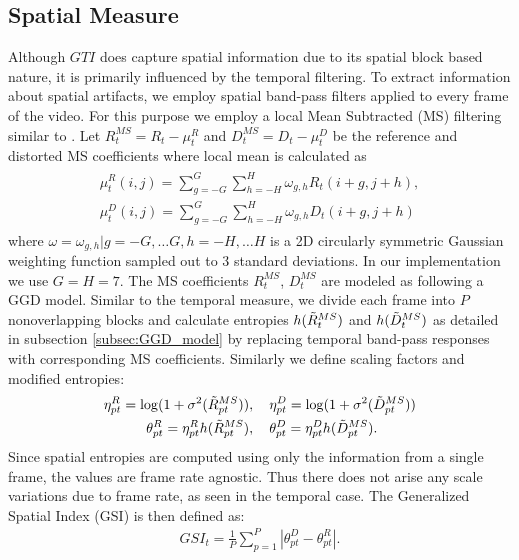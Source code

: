 \documentclass[journal]{IEEEtran}
\begin{document}
\subsection{Spatial Measure}
Although $GTI$ does capture spatial information due to its spatial block based nature, it is primarily influenced by the temporal filtering. To extract information about spatial artifacts, we employ spatial band-pass filters applied to every frame of the video. For this purpose we employ a local Mean Subtracted (MS) filtering similar to \cite{bampis2017speed}. Let $R_t ^{MS} = R_t - \mu_t ^R$ and $D_t ^{MS} = D_t - \mu_t ^D$ be the reference and distorted MS coefficients where local mean is calculated as
\begin{align*}
\begin{aligned}
    \mu_t ^R(i,j) = \sum_{g=-G} ^G \sum_{h=-H} ^H \omega_{g,h} R_t(i+g,j+h), \\ \mu_t ^D(i,j) = \sum_{g=-G} ^G \sum_{h=-H} ^H \omega_{g,h} D_t(i+g,j+h)
\end{aligned}
\end{align*}
where $\omega = {\omega_{g,h}|g = -G,\ldots G, h = -H,\ldots H}$ is a 2D
circularly symmetric Gaussian weighting function sampled out to 3 standard deviations. In our implementation we use $G = H = 7$. The MS coefficients $R_t ^{MS}$, $D_t ^{MS}$ are modeled as following a GGD model. Similar to the temporal measure, we divide each frame into $P$ nonoverlapping blocks and calculate entropies $h(\Tilde{R}_t ^{MS})$ and $h(\Tilde{D}_t ^{MS})$ as detailed in subsection \ref{subsec:GGD_model} by replacing temporal band-pass responses with corresponding MS coefficients. Similarly we define scaling factors and modified entropies:
\begin{align*}
\begin{aligned}
    \eta_{pt} ^R = \log(1+\sigma^2(\Tilde{R}_{pt}^{MS}))&, \quad \eta_{pt}^D = \log(1+\sigma^2(\Tilde{D}_{pt}^{MS})) \\
\theta_{pt} ^R = \eta_{pt} ^R h(\Tilde{R}_{pt}^{MS})&, \quad \theta_{pt} ^D = \eta_{pt} ^D h(\Tilde{D}_{pt}^{MS}).
    \end{aligned}
\end{align*}
Since spatial entropies are computed using only the information from a single frame, the values are frame rate agnostic. Thus there does not arise any scale variations due to frame rate, as seen in the temporal case. The Generalized Spatial Index (GSI) is then defined as:
\begin{align}
    GSI_t = \frac{1}{P}\sum_{p=1} ^P |\theta_{pt} ^D - \theta_{pt} ^R|.
    \label{eqn:GSI}
\end{align}
\end{document}
